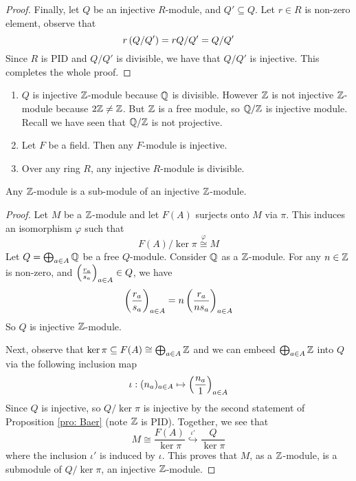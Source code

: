 \begin{proof}
    Finally, let $Q$ be an injective $R$-module, and $Q'\subseteq Q$. Let $r\in R$ is non-zero element, observe that 
    \[r\left(Q/Q'\right) = rQ/Q' = Q/Q'\]
    Since $R$ is PID and $Q/Q'$ is divisible, we have that $Q/Q'$ is injective. This completes the whole proof.
\end{proof}


\begin{ex}
    \hfill

    \begin{enumerate}
        \item $Q$ is injective ${\mathbb Z}$-module because ${\mathbb Q}$ is divisible. However ${\mathbb Z}$ is not injective ${\mathbb Z}$-module because $2{\mathbb Z} \neq {\mathbb Z}$. But ${\mathbb Z}$ is a free module, so ${\mathbb Q}/{\mathbb Z}$ is injective module. Recall we have seen that ${\mathbb Q}/{\mathbb Z}$ is not projective.
        \item Let $F$ be a field. Then any $F$-module is injective.
        \item Over any ring $R$, any injective $R$-module is divisible. 
    \end{enumerate}
\end{ex}

\medskip

\begin{cor} \label{cor: Z-mod sub inj}
    Any ${\mathbb Z}$-module is a sub-module of an injective ${\mathbb Z}$-module.
\end{cor}
\begin{proof}
    Let $M$ be a ${\mathbb Z}$-module and let $F(A)$ surjects onto $M$ via $\pi$. This induces an isomorphism $\varphi$ such that
    \[F(A)/\ker \pi \overset{\varphi}{\cong} M\]
    Let $Q = \bigoplus_{a\in A} {\mathbb Q}$ be a free $Q$-module. Consider ${\mathbb Q}$ as a ${\mathbb Z}$-module. For any $n\in {\mathbb Z}$ is non-zero, and $\left(\frac{r_a}{s_a}\right)_{a\in A} \in Q$, we have
    \[\left(\frac{r_a}{s_a}\right)_{a\in A} = n\left(\frac{r_a}{ns_a}\right)_{a\in A}\]
    So $Q$ is injective ${\mathbb Z}$-module. 

    Next, observe that $\ker\pi \subseteq F(A) \cong \bigoplus_{a\in A} {\mathbb Z}$ and we can embeed $\bigoplus_{a\in A} {\mathbb Z}$ into $Q$ via the following inclusion map
    \[\iota:(n_a)_{a\in A} \mapsto \left(\frac{n_a}{1}\right)_{a\in A}\]
    Since $Q$ is injective, so $Q/\ker \pi$ is injective by the second statement of Proposition \ref{pro: Baer} (note ${\mathbb Z}$ is PID). Together, we see that 
    \[M\cong \frac{F(A)}{\ker\pi} \overset{\iota'}{\hookrightarrow} \frac{Q}{\ker\pi}\]
    where the inclusion $\iota'$ is induced by $\iota$. This proves that $M$, as a ${\mathbb Z}$-module, is a submodule of $Q/\ker \pi$, an injective ${\mathbb Z}$-module.
\end{proof}

